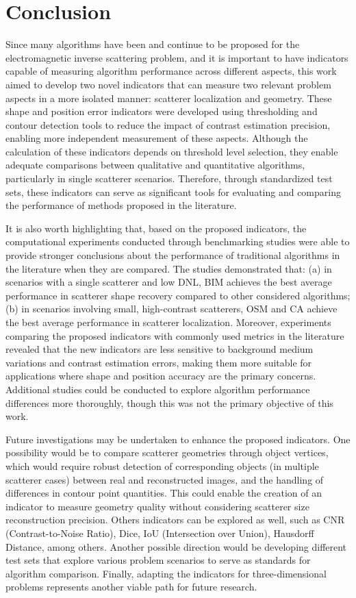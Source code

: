 \documentclass{ieeeaccess}
\begin{document}
\section{Conclusion}\label{sec:conclusion}

    Since many algorithms have been and continue to be proposed for the electromagnetic inverse scattering problem, and it is important to have indicators capable of measuring algorithm performance across different aspects, this work aimed to develop two novel indicators that can measure two relevant problem aspects in a more isolated manner: scatterer localization and geometry. These shape and position error indicators were developed using thresholding and contour detection tools to reduce the impact of contrast estimation precision, enabling more independent measurement of these aspects. Although the calculation of these indicators depends on threshold level selection, they enable adequate comparisons between qualitative and quantitative algorithms, particularly in single scatterer scenarios. Therefore, through standardized test sets, these indicators can serve as significant tools for evaluating and comparing the performance of methods proposed in the literature.

    It is also worth highlighting that, based on the proposed indicators, the computational experiments conducted through benchmarking studies were able to provide stronger conclusions about the performance of traditional algorithms in the literature when they are compared. The studies demonstrated that: (a) in scenarios with a single scatterer and low DNL, BIM achieves the best average performance in scatterer shape recovery compared to other considered algorithms; (b) in scenarios involving small, high-contrast scatterers, OSM and CA achieve the best average performance in scatterer localization. Moreover, experiments comparing the proposed indicators with commonly used metrics in the literature revealed that the new indicators are less sensitive to background medium variations and contrast estimation errors, making them more suitable for applications where shape and position accuracy are the primary concerns. Additional studies could be conducted to explore algorithm performance differences more thoroughly, though this was not the primary objective of this work.

    Future investigations may be undertaken to enhance the proposed indicators. One possibility would be to compare scatterer geometries through object vertices, which would require robust detection of corresponding objects (in multiple scatterer cases) between real and reconstructed images, and the handling of differences in contour point quantities. This could enable the creation of an indicator to measure geometry quality without considering scatterer size reconstruction precision. Others indicators can be explored as well, such as CNR (Contrast-to-Noise Ratio), Dice, IoU (Intersection over Union), Hausdorff Distance, among others. Another possible direction would be developing different test sets that explore various problem scenarios to serve as standards for algorithm comparison. Finally, adapting the indicators for three-dimensional problems represents another viable path for future research.
\end{document}
